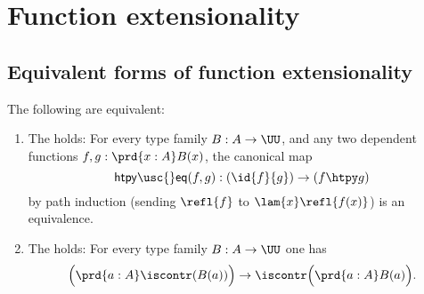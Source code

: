 \chapter{Function extensionality}

\section{Equivalent forms of function extensionality}
\begin{thm}\label{thm:funext_wkfunext}
The following are equivalent:
\begin{enumerate}
\item The  holds: For every type family $B:A\to\UU$, and any two dependent functions $f,g:\prd{x:A}B(x)$, the canonical map
\begin{equation*}
\mathsf{htpy\usc{}eq}(f,g) : (\id{f}{g})\to (f\htpy g)
\end{equation*}
by path induction (sending $\refl{f}$ to $\lam{x}\refl{f(x)}$) is an equivalence.
\item The  holds: For every type family $B:A\to\UU$ one has
\begin{equation*}
\Big(\prd{a:A}\iscontr(B(a))\Big)\to\iscontr\Big(\prd{a:A}B(a)\Big).
\end{equation*}
\end{enumerate}
\end{thm}

